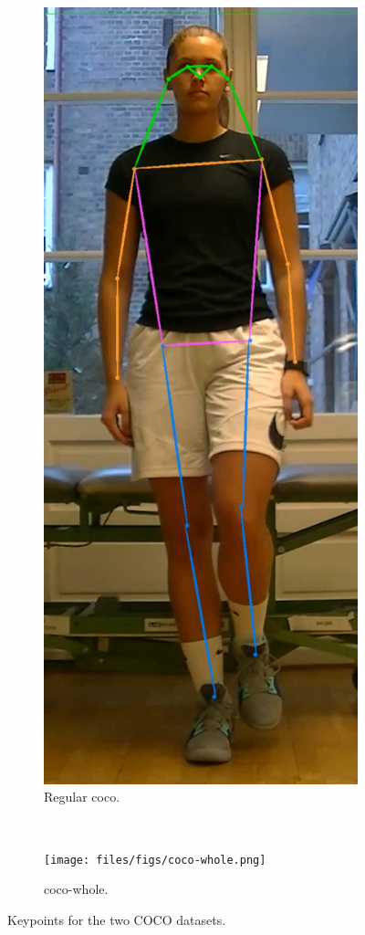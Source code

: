 \begin{figure}
 \centering
 \begin{subfigure}[t]{0.4\textwidth}
  \includegraphics[width=\textwidth]{files/figs/coco.png}
  \caption{Regular \gls{coco}.}
  \label{fig:coco}
 \end{subfigure}
 ~
 \begin{subfigure}[t]{0.4\textwidth}
  \texttt{[image: files/figs/coco-whole.png]}
  \caption{\gls{coco-whole}.}
  \label{fig:coco-wholebody}
 \end{subfigure}
 \caption{Keypoints for the two COCO datasets.}
\end{figure}


